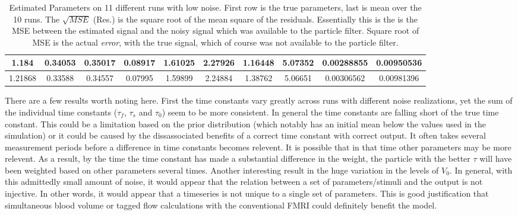 \begin{table}[t]
\begin{tabular}{|c | c | c | c | c | c | c | c | c | c |}
1.184 & 0.34053 & 0.35017 & 0.08917 & 1.61025 & 2.27926 & 1.16448 & 5.07352   &  0.00288855  & 0.00950536  \\
\hline                                                                           
1.21868 & 0.33588 & 0.34557 & 0.07995 & 1.59899 & 2.24884 & 1.38762 & 5.06651 & 0.00306562     & 0.00981396 \\
\hline 
\end{tabular}
\caption{Estimated Parameters on 11 different runs with low noise. First row is the true parameters,
last is mean over the 10 runs. The $\sqrt{MSE}$ (Res.) is the square root of the mean square of the
residuals. Essentially this is the is the MSE between the estimated signal and the noisy signal which 
was available to the particle filter. Square root of MSE is the actual \emph{error}, with the true signal,
which of course was not available to the particle filter.}
\label{tab:LowNoiseResults} 
\end{table}
There are a few results worth noting here. First the time constants vary greatly across
runs with different noise realizations, yet the sum of the individual time constants
($\tau_f$, $\tau_s$ and $\tau_0$) seem to be more consistent. In general the 
time constants are falling short of the true time constant. This could be a limitation
based on the prior distribution (which notably has an initial mean below the values used
in the simulation) or it could be caused by the dissassociated benefits of a correct time
constant with correct output. It often takes several measurement periods before a difference
in time constants becomes relevent. It is possible that in that time other parameters 
may be more relevent. As a result, by the time the time constant has made a substantial
difference in the weight, the 
particle with the better $\tau$ will have been weighted based on other parameters several
times. Another interesting result in the huge variation in the levels of $V_0$. In general,
with this admittedly small amount of noise, it would appear that the relation between a set
of parameters/stimuli and the output is not injective. In other words, it would appear
that a timeseries is not unique to a single set of parameters. This is good justification that 
simultaneous blood volume or tagged flow calculations with the conventional FMRI 
could definitely benefit the model. 
